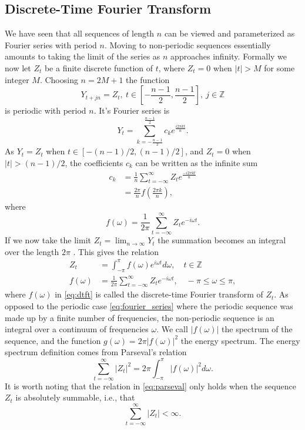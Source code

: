 \documentclass[a4paper, 10pt]{memoir}
\theoremstyle{plain}
\theoremstyle{definition}
\theoremstyle{remark}
\begin{document}
\subsection{Discrete-Time Fourier Transform}
We have seen that all sequences of length $n$ can be viewed and parameterized as Fourier series with period $n$.
Moving to non-periodic sequences essentially amounts to taking the limit of the series as $n$ approaches infinity.
Formally we now let $Z_t$ be a finite discrete function of $t$, where $Z_t = 0$ when $|t| > M$ for some integer $M$.
Choosing $n = 2M + 1$ the function
\begin{equation*}
        Y_{t + jn} = Z_t, \ t \in \left[ -\frac{n-1}{2}, \frac{n-1}{2} \right], \ j \in \mathbb{Z}
\end{equation*}
is periodic with period $n$.
It's Fourier series is 
\begin{equation*}
        Y_t = \sum_{k = -\frac{n - 1}{2}}^{\frac{n -1 }{2}} c_k e^{\frac{i2 \pi kt}{n}}.
\end{equation*}
As $Y_t = Z_t$ when $t \in [-(n-1)/2, (n-1)/2]$, and $Z_t = 0$ when $|t| > (n-1)/2$, the coefficients $c_k$ can be written as the infinite sum
\begin{align*}
        c_k &= \frac{1}{n}\sum_{t = - \infty}^{\infty} Z_t e^{\frac{-i2\pi kt}{n}} \\
        & = \frac{2 \pi}{n}f\left(\frac{2\pi k}{n}\right),
\end{align*}
where 
\begin{equation*}
        f(\omega) = \frac{1}{2\pi} \sum_{t = -\infty}^{\infty} Z_t e^{-i\omega t}.
\end{equation*}
If we now take the limit $Z_t = \lim_{n \rightarrow \infty} Y_t$ the summation becomes an integral over the length $2\pi$ \cite{wei}.
This gives the relation
\begin{align}\label{eq:dtft_inv}
        Z_t &= \int_{-\pi}^{\pi} f(\omega) e^{i\omega t} d\omega, \quad t \in \mathbb{Z} \\
        \label{eq:dtft}
        f(\omega) &= \frac{1}{2 \pi} \sum_{t = -\infty}^{\infty} Z_t e^{-i \omega t}, \quad -\pi \leq \omega \leq \pi,
\end{align}
where $f(\omega)$ in \eqref{eq:dtft} is called the discrete-time Fourier transform of $Z_t$.
As opposed to the periodic case \eqref{eq:fourier_series} where the periodic sequence was made up by a finite number of frequencies, the non-periodic sequence is an integral over a continuum of frequencies $\omega$.
We call $|f(\omega)|$ the spectrum of the sequence, and the function $g(\omega) = 2 \pi |f(\omega)|^2$ the energy spectrum.
The energy spectrum definition comes from Parseval's relation 
\begin{equation}\label{eq:parseval}
        \sum_{t = -\infty}^{\infty} |Z_t|^2 = 2 \pi \int_{- \pi}^{\pi}|f(\omega)|^2 d\omega.
\end{equation}
It is worth noting that the relation in \eqref{eq:parseval} only holds when the sequence $Z_t$ is absolutely summable, i.e., that
\begin{equation}\label{eq:absuletly_summable}
        \sum_{ t = -\infty}^{\infty}|Z_t| < \infty.
\end{equation}
\end{document}
